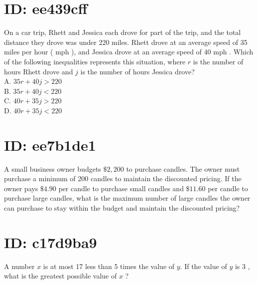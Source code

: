 \section*{ID: ee439cff}
On a car trip, Rhett and Jessica each drove for part of the trip, and the total distance they drove was under 220 miles. Rhett drove at an average speed of 35 miles per hour ( mph ), and Jessica drove at an average speed of 40 mph . Which of the following inequalities represents this situation, where $r$ is the number of hours Rhett drove and $j$ is the number of hours Jessica drove?\\
A. $35 r+40 j>220$\\
B. $35 r+40 j<220$\\
C. $40 r+35 j>220$\\
D. $40 r+35 j<220$



















































\section*{ID: ee7b1de1}
A small business owner budgets $\$ 2,200$ to purchase candles. The owner must purchase a minimum of 200 candles to maintain the discounted pricing. If the owner pays $\$ 4.90$ per candle to purchase small candles and $\$ 11.60$ per candle to purchase large candles, what is the maximum number of large candles the owner can purchase to stay within the budget and maintain the discounted pricing?

\section*{ID: c17d9ba9}
A number $x$ is at most 17 less than 5 times the value of $y$. If the value of $y$ is 3 , what is the greatest possible value of $x$ ?

